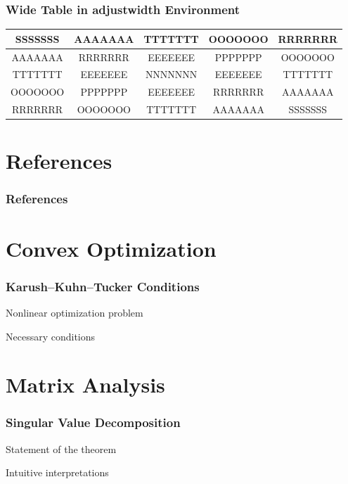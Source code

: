 \documentclass[
]{beamer}
\begin{document}
\begin{frame}
\frametitle{Wide Table in \alert{adjustwidth} Environment}
\begin{adjustwidth}{-2cm}{-2cm}
    \begin{table}
        \begin{tabular}{|c|c|c|c|c|} \hline
            SSSSSSS & AAAAAAA & TTTTTTT & OOOOOOO & RRRRRRR\\ \hline
            AAAAAAA & RRRRRRR & EEEEEEE & PPPPPPP & OOOOOOO\\ \hline
            TTTTTTT & EEEEEEE & NNNNNNN & EEEEEEE & TTTTTTT\\ \hline
            OOOOOOO & PPPPPPP & EEEEEEE & RRRRRRR & AAAAAAA\\ \hline
            RRRRRRR & OOOOOOO & TTTTTTT & AAAAAAA & SSSSSSS\\ \hline
        \end{tabular}
    \end{table}
\end{adjustwidth}
\end{frame}

\section*{References}

\begin{frame}%
\frametitle{References}
\footnotesize


\end{frame}

\appendix

\section*{Convex Optimization}

\begin{frame}[t]
\frametitle{Karush–Kuhn–Tucker Conditions}
Nonlinear optimization problem\par\pause
Necessary conditions
\end{frame}

\section*{Matrix Analysis}

\begin{frame}
\frametitle{Singular Value Decomposition}
Statement of the theorem\par\pause
\vspace{\baselineskip}
Intuitive interpretations
\end{frame}
\end{document}
